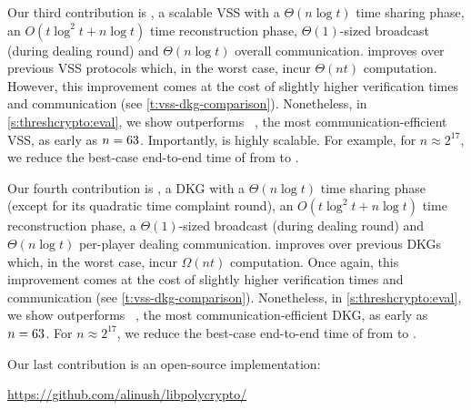 Our third contribution is \ourvss, a scalable VSS with a $\Theta(n\log{t})$ time sharing phase, an $O(t\log^2{t}+n\log{t})$ time reconstruction phase, $\Theta(1)$-sized broadcast (during dealing round) and $\Theta(n\log{t})$ overall communication.
\ourvss improves over previous VSS protocols which, in the worst case, incur $\Theta(nt)$ computation.
However, this improvement comes at the cost of slightly higher verification times and communication (see \cref{t:vss-dkg-comparison}).
Nonetheless, in \cref{s:threshcrypto:eval}, we show \ourvss outperforms \evss~\cite{KZG10a}, the most communication-efficient VSS, as early as $n=63$. 
Importantly, \ourvss is highly scalable. 
For example, for $n\approx 2^{17}$, we reduce the best-case end-to-end time of \evss from  to .

Our fourth contribution is \ourdkg, a DKG with a $\Theta(n\log{t})$ time sharing phase (except for its quadratic time complaint round), an $O(t\log^2{t}+n\log{t})$ time reconstruction phase, a $\Theta(1)$-sized broadcast (during dealing round) and $\Theta(n\log{t})$ per-player dealing communication.
\ourdkg improves over previous DKGs which, in the worst case, incur $\Omega(nt)$ computation.
Once again, this improvement comes at the cost of slightly higher verification times and communication (see \cref{t:vss-dkg-comparison}).
Nonetheless, in \cref{s:threshcrypto:eval}, we show \ourdkg outperforms \ejfdkg~\cite{Kate2010}, the most communication-efficient DKG, as early as $n=63$.
For $n\approx 2^{17}$, we reduce the best-case end-to-end time of \ejfdkg from  to .

Our last contribution is an open-source implementation:
\begin{center}
\url{https://github.com/alinush/libpolycrypto/}
\end{center}

